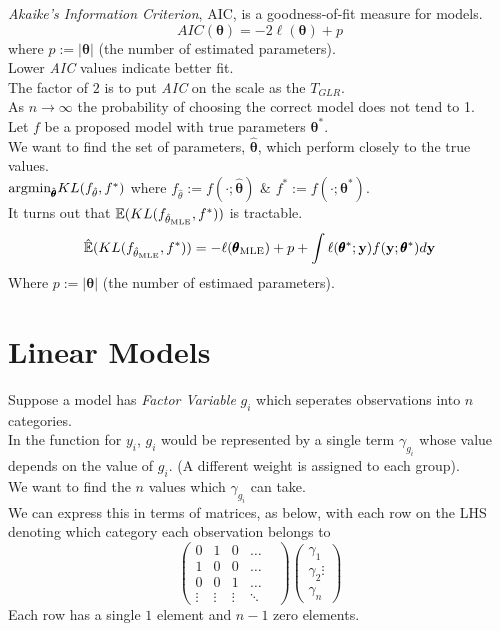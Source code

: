 \documentclass[11pt,a4paper]{article}
\begin{document}
\textit{Akaike's Information Criterion}, AIC, is a goodness-of-fit measure for models.
$$AIC(\pmb\theta)=-2\ell(\pmb\theta)+p$$
where $p:=|\pmb\theta|$ (the number of estimated parameters).\\
Lower \textit{AIC} values indicate better fit.\\
\nb The factor of $2$ is to put \textit{AIC} on the scale as the $T_{GLR}$.\\

As $n\to\infty$ the probability of choosing the correct model does not tend to 1.\\

Let $f$ be a proposed model with true parameters $\pmb\theta^*$.\\
We want to find the set of parameters, $\hat{\pmb\theta}$, which perform closely to the true values.\\
\ie $\text{argmin}_{\hat{\pmb\theta}}KL(f_{\hat\theta},f^*)$ where $f_{\hat\theta}:=f(\cdot;\hat{\pmb\theta})$ \& $f^*:=f(\cdot;\pmb\theta^*)$.\\
It turns out that $\mathbb{E}(KL(f_{\hat\theta_\text{MLE}},f^*))$ is tractable.
$$\hat{\mathbb{E}}(KL(f_{\hat\theta_\text{MLE}},f^*))=-\ell(\pmb\theta_\text{MLE})+p+\int\ell(\pmb\theta^*;\textbf{y})f(\textbf{y};\pmb\theta^*)d\textbf{y}$$
Where $p:=|\pmb\theta|$ (the number of estimaed parameters).\\



\section{Linear Models}

Suppose a model has \textit{Factor Variable} $g_i$ which seperates observations into $n$ categories.\\
In the function for $y_i$, $g_i$ would be represented by a single term $\gamma_{g_i}$ whose value depends on the value of $g_i$. (\ie A different weight is assigned to each group). \\
We want to find the $n$ values which $\gamma_{g_i}$ can take.\\
We can express this in terms of matrices, as below, with each row on the LHS denoting which category each observation belongs to
$$\begin{pmatrix}0&1&0&\dots&\\1&0&0&\dots\\0&0&1&\dots\\\vdots&\vdots&\vdots&\ddots\end{pmatrix}\begin{pmatrix}\gamma_1\\\gamma_2\vdots\\\gamma_n\end{pmatrix}$$
\nb Each row has a single $1$ element and $n-1$ zero elements.\\
\end{document}
